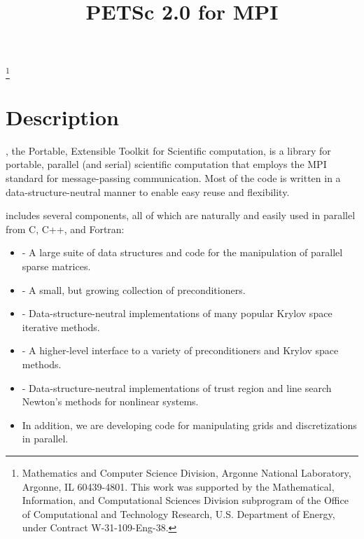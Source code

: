 \pagestyle{empty}

\pagestyle{empty}
\title{PETSc 2.0 for MPI}
\thanks{Mathematics and Computer Science Division,
Argonne National Laboratory,
Argonne, IL 60439-4801.
This work was supported by the Mathematical,
        Information, and Computational Sciences Division subprogram of
        the Office of Computational and Technology Research,
        U.S. Department of Energy, under Contract W-31-109-Eng-38.}

\date{}
\maketitle

\section*{Description}

, the Portable, Extensible Toolkit for Scientific computation,
is a library for portable, parallel (and serial)
scientific computation that employs the MPI standard for
message-passing communication.  Most of the code is written in a
data-structure-neutral manner to enable easy reuse and flexibility.

 includes several components, all of which
are naturally and easily used in parallel from C, C++, and Fortran:

\vspace{-.4cm}

\begin{itemize}
\item {} - A large suite of data structures and code
      for the manipulation of parallel sparse matrices.
\item {} - A small, but growing collection of preconditioners.
\item {} - Data-structure-neutral implementations of
      many popular Krylov space iterative methods.
\item {} - A higher-level interface to a variety
      of preconditioners and Krylov space methods.
\item {} - Data-structure-neutral 
      implementations of trust region and line search Newton's 
      methods for nonlinear systems. 
\item In addition, we are developing code for manipulating grids
      and discretizations in parallel.
\end{itemize}


